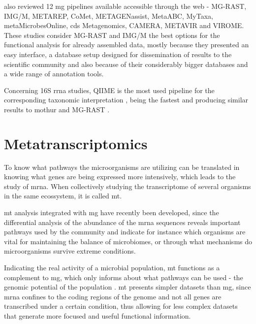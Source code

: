 \documentclass[
  oneside,
  11pt, a4paper,
  footinclude=true,
  headinclude=true,
  cleardoublepage=empty
]{scrbook}
\begin{document}
    \cite{Dudhagara2015} also reviewed 12 \gls{mg} pipelines available accessible through the web - MG-RAST, IMG/M, METAREP, CoMet, METAGENassist, MetaABC, MyTaxa, metaMicrobesOnline, \gls{cds} Metagenomics, CAMERA, METAVIR and VIROME. These studies consider MG-RAST and IMG/M the best options for the functional analysis for already assembled data, mostly because they presented an easy interface, a database setup designed for dissemination of results to the scientific community and also because of their considerably bigger databases and a wide range of annotation tools.
    
    Concerning 16S \gls{rrna} studies, QIIME is the most used pipeline for the corresponding taxonomic interpretation \citep{Oulas2015}, being the fastest and producing similar results to mothur and MG-RAST \citep{Plummer2015}.
    
    \section{Metatranscriptomics}
    
    To know what pathways the microorganisms are utilizing can be translated in knowing what genes are being expressed more intensively, which leads to the study of \gls{mrna}.
    When collectively studying the transcriptome of several organisms in the same ecossystem, it is called \gls{mt}. 
    
    \gls{mt} analysis integrated with \gls{mg} have recently been developed, since the differential analysis of the abundance of the \gls{mrna} sequences reveals important pathways used by the community and indicate for instance which organisms are vital for maintaining the balance of microbiomes, or through what mechanisms do microorganisms survive extreme conditions. 
    
    Indicating the real activity of a microbial population, \gls{mt} functions as a complement to \gls{mg}, which only informs about what pathways can be used - the genomic potential of the population \citep{Bikel2015, Aguiar-pulido2016}. \gls{mt} presents simpler datasets than \gls{mg}, since \gls{mrna} confines to the coding regions of the genome and not all genes are transcribed under a certain condition, thus allowing for less complex datasets that generate more focused and useful functional information.
    
\end{document}
